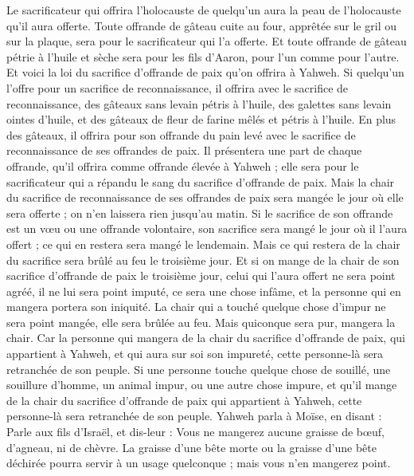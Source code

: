 \begin{multicols}{2}
Le sacrificateur qui offrira l’holocauste de quelqu’un aura la peau de l’holocauste qu’il aura offerte.
Toute offrande de gâteau cuite au four, apprêtée sur le gril ou sur la plaque, sera pour le sacrificateur qui l’a offerte.
Et toute offrande de gâteau pétrie à l’huile et sèche sera pour les fils d’Aaron, pour l’un comme pour l’autre.
Et voici la loi du sacrifice d’offrande de paix qu'on offrira à Yahweh.
Si quelqu'un l'offre pour un sacrifice de reconnaissance, il offrira avec le sacrifice de reconnaissance, des gâteaux sans levain pétris à l'huile, des galettes sans levain ointes d'huile, et des gâteaux de fleur de farine mêlés et pétris à l'huile.
En plus des gâteaux, il offrira pour son offrande du pain levé avec le sacrifice de reconnaissance de ses offrandes de paix.
Il présentera une part de chaque offrande, qu'il offrira comme offrande élevée à Yahweh ; elle sera pour le sacrificateur qui a répandu le sang du sacrifice d’offrande de paix.
Mais la chair du sacrifice de reconnaissance de ses offrandes de paix sera mangée le jour où elle sera offerte ; on n'en laissera rien jusqu'au matin.
Si le sacrifice de son offrande est un vœu ou une offrande volontaire, son sacrifice sera mangé le jour où il l’aura offert ; ce qui en restera sera mangé le lendemain.
Mais ce qui restera de la chair du sacrifice sera brûlé au feu le troisième jour.
Et si on mange de la chair de son sacrifice d’offrande de paix le troisième jour, celui qui l'aura offert ne sera point agréé, il ne lui sera point imputé, ce sera une chose infâme, et la personne qui en mangera portera son iniquité.
La chair qui a touché quelque chose d’impur ne sera point mangée, elle sera brûlée au feu. Mais quiconque sera pur, mangera la chair.
Car la personne qui mangera de la chair du sacrifice d’offrande de paix, qui appartient à Yahweh, et qui aura sur soi son impureté, cette personne-là sera retranchée de son peuple.
Si une personne touche quelque chose de souillé, une souillure d'homme, un animal impur, ou une autre chose impure, et qu'il mange de la chair du sacrifice d’offrande de paix qui appartient à Yahweh, cette personne-là sera retranchée de son peuple.
Yahweh parla à Moïse, en disant :
Parle aux fils d'Israël, et dis-leur : Vous ne mangerez aucune graisse de bœuf, d'agneau, ni de chèvre.
La graisse d’une bête morte ou la graisse d’une bête déchirée pourra servir à un usage quelconque ; mais vous n'en mangerez point.

\end{multicols}
